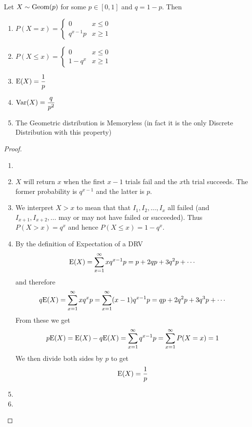     \begin{theorem}
        Let $X\sim \geom(p)$ for some $p\in [0,1]$ and $q=1-p$. Then
        \begin{enumerate}
            \item 
            $
                P(X=x)=\begin{cases}
                    0 & x \le 0
                    \\
                    q^{x-1}p & x\ge 1
                    
                \end{cases}
            $
            \item 
            $
                P(X\le x)=\begin{cases}
                    0 & x \le 0
                    \\
                    1-q^x & x\ge 1
                \end{cases}
            $
            \item $\E(X)=\displaystyle\frac 1 p$
            \item $\Var(X)=\displaystyle \frac q {p^2}$
            \item The Geometric distribution is Memoryless (in fact it is the only Discrete Distribution with this property)
        \end{enumerate}
        \begin{proof}
            \begin{enumerate}
                \item[]
                \item $X$ will return $x$ when the first $x-1$ trials fail and the $x$th trial succeeds. The former probability is $q^{x-1}$ and the latter is $p$.
                \item We interpret $X>x$ to mean that that $I_1,I_2,...,I_x$ all failed (and $I_{x+1}, I_{x+2},...$ may or may not have failed or succeeded). Thus $P(X>x)=q^x$ and hence $P(X\le x)=1-q^x$.
                \item By the definition of Expectation of a DRV
                \[
                    \E(X)=\sum_{x=1}^\infty xq^{x-1}p=p+2qp+3q^2p+\cdots
                \]
                and therefore
                \[
                    q\E(X)=\sum_{x=1}^\infty xq^x p=\sum_{x=1}^\infty (x-1)q^{x-1} p =  qp+2q^2p+3q^3p+\cdots
                \]
                From these we get
                \[
                    p\E(X)=\E(X)-q\E(X)=\sum_{x=1}^\infty q^{x-1}p=\sum_{x=1}^\infty P(X=x)=1
                \]
                We then divide both sides by $p$ to get
                \[
                    \E(X)=\frac 1p
                \]
                \item \todo
                \item \todo
            \end{enumerate}
        \end{proof}
    \end{theorem}
